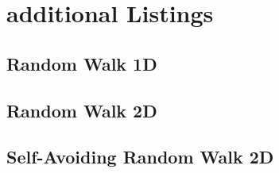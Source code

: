 \section{additional Listings}



\subsection{Random Walk 1D}

\subsection{Random Walk 2D}

\subsection{Self-Avoiding Random Walk 2D}



%
%


